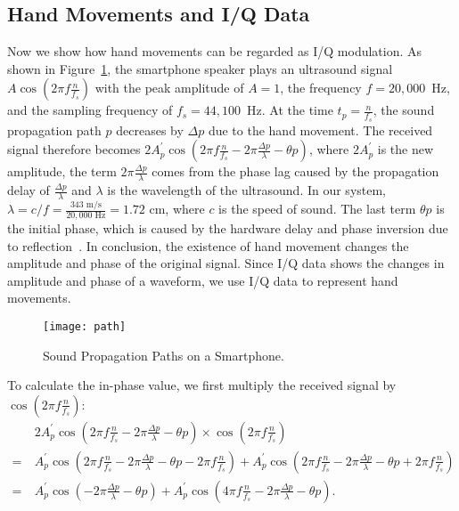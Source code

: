 \subsection{Hand Movements and I/Q Data}
Now we show how hand movements can be regarded as I/Q modulation. As shown in Figure~\ref{fig:soundpath}, the smartphone speaker plays an ultrasound signal $A\cos \left (2\pi f \frac{n}{f_s}\right)$ with the peak amplitude of $A=1$, the frequency $f = 20,000 $~Hz, and the sampling frequency of $f_s = 44,100 $~Hz. At the time $t_p = \frac{n}{f_s}$, the sound propagation path $p$ decreases by $\Delta p$ due to the hand movement. The received signal therefore becomes $2A^\prime_p \cos \left (2\pi f \frac{n}{f_s}  - 2 \pi \frac{\Delta p}{\lambda} - \theta p\right)$, where $2A^\prime_p$ is the new amplitude, the term $2 \pi \frac{\Delta p}{\lambda}$ comes from the phase lag caused by the propagation delay of $\frac{\Delta p}{\lambda}$ and $\lambda$ is the wavelength of the ultrasound. In our system, $\lambda = c/f = \frac{343 \text{~m/s}}{20,000 \text{~Hz}} = 1.72 \text{~cm}$, where $c$ is the speed of sound. The last term $ \theta p$ is the  initial phase, which is caused by the hardware delay and phase inversion due to reflection~\cite{wang2016device}.  
In conclusion, the existence of hand movement changes the amplitude and phase of the original signal. Since I/Q data shows the changes in amplitude and phase of a waveform, we use I/Q data to represent hand movements.

\begin{figure}[h]
	\centering
	\texttt{[image: path]}
	\caption{Sound Propagation Paths on a Smartphone.}
	\label{fig:soundpath}
\end{figure}

To calculate the in-phase value, we first multiply the received signal by $\cos \left (2\pi f \frac{n}{f_s}\right)$:
\begin{align*}
&2A^\prime_p \cos \left (2\pi f \frac{n}{f_s}  - 2 \pi \frac{\Delta p}{\lambda} - \theta p\right) \times \cos \left (2\pi f \frac{n}{f_s}\right)\\        
=~&A^\prime_p \cos \left (2\pi f \frac{n}{f_s}  - 2 \pi \frac{\Delta p}{\lambda} - \theta p - 2\pi f \frac{n}{f_s}\right)  + A^\prime_p \cos \left (2\pi f \frac{n}{f_s}  - 2 \pi \frac{\Delta p}{\lambda} - \theta p + 2\pi f \frac{n}{f_s}\right)  \\
=~&A^\prime_p \cos \left( - 2 \pi \frac{\Delta p}{\lambda} - \theta p \right)  + A^\prime_p \cos (4\pi f \frac{n}{f_s}  - 2 \pi \frac{\Delta p}{\lambda} - \theta p )  .
\end{align*}

